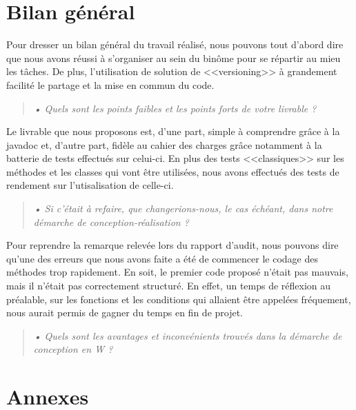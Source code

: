 \documentclass[12pt,a4paper]{report}
\begin{document}
\chapter*{Bilan général}
\label{chapter:Bilan général} %
Pour dresser un bilan général du travail réalisé, nous pouvons tout d'abord dire que nous avons réussi à s'organiser au sein du binôme pour se répartir au mieu les tâches. De plus, l'utilisation de solution de <<versioning>> à grandement facilité le partage et la mise en commun du code.
\begin{quotation}
\textit{• Quels sont les points faibles et les points forts de votre livrable ?}
\end{quotation}

Le livrable que nous proposons est, d'une part, simple à comprendre grâce à la javadoc et, d'autre part, fidèle au cahier des charges grâce notamment à la batterie de tests effectués sur celui-ci. En plus des tests <<classiques>> sur les méthodes et les classes qui vont être utilisées, nous avons effectués des tests de rendement sur l'utisalisation de celle-ci. 

\begin{quotation}
\textit{• Si c'était à refaire, que changerions-nous, le cas échéant, dans notre démarche de conception-réalisation ?}
\end{quotation}

Pour reprendre la remarque relevée lors du rapport d'audit, nous pouvons dire qu'une des erreurs que nous avons faite a été de commencer le codage des méthodes trop rapidement. En soit, le premier code proposé n'était pas mauvais, mais il n'était pas correctement structuré. En effet, un temps de réflexion au préalable, sur les fonctions et les conditions qui allaient être appelées fréquement, nous aurait permis de gagner du temps en fin de projet. 

\begin{quotation}
\textit{• Quels sont les avantages et inconvénients trouvés dans la démarche de conception en W ?}
\end{quotation}


\chapter*{Annexes}
\label{chapter:Annexes} %
\end{document}
